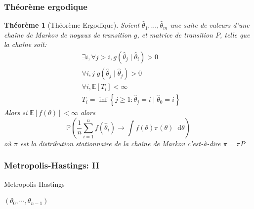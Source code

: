 \documentclass[dvipsnames,10pt]{beamer}
\newcommand*\diff{\mathop{}\!\mathrm{d}}
\theoremstyle{plain}
\newtheorem{theoreme}{Théorème}
\theoremstyle{definition}
\begin{document}
\begin{frame}
\frametitle{Théorème ergodique}
\begin{theoreme}[Théorème Ergodique]\label{thrm:ergodique}
    Soient $\hat{\theta}_1,\dotsc,\hat{\theta}_m$ une suite de valeurs d'une chaîne de Markov de noyaux de transition $g$, et matrice de transition $P$, telle que la chaîne soit:
    \begin{align*}
                &\exists i , \forall j > i,  g \left( \hat{\theta}_j \mid \hat{\theta}_i \right) > 0 \\
                &\forall i,j \; g \left( \hat{\theta}_j \mid \hat{\theta}_j \right) > 0 \\
            &\forall i , \mathbb{E} \left[ T_i \right] < \infty \\
            &T_i = \inf \left\{ j \geq 1 : \hat{\theta}_j = i \mid \hat{\theta}_0 = i \right\}
    \end{align*}
    Alors si $\mathbb{E} \left[ f(\theta) \right] < \infty$ alors
    \begin{equation*}
        \mathbb{P} \left( \frac{1}{n} \sum_{i=1}^n f(\hat{\theta}_i) \to \int f(\theta) \pi ( \theta ) \diff \theta \right)
    \end{equation*}
    où $\pi$ est la distribution stationnaire de la chaîne de Markov c'est-à-dire $\pi = \pi P$
\end{theoreme}
\end{frame}

\begin{frame}[fragile]
\frametitle{Metropolis-Hastings: II}
\begin{algorithm}[H]
\caption{Metropolis-Hastings} \label{metropolis.hastings.alg}
\begin{algorithmic}
        \Else {}
        \EndIf
    \EndFor
    \State \Return $(\theta_0,\cdots,\theta_{n-1})$
    \EndProcedure
\end{algorithmic}
\end{algorithm}
\end{frame}
\end{document}
